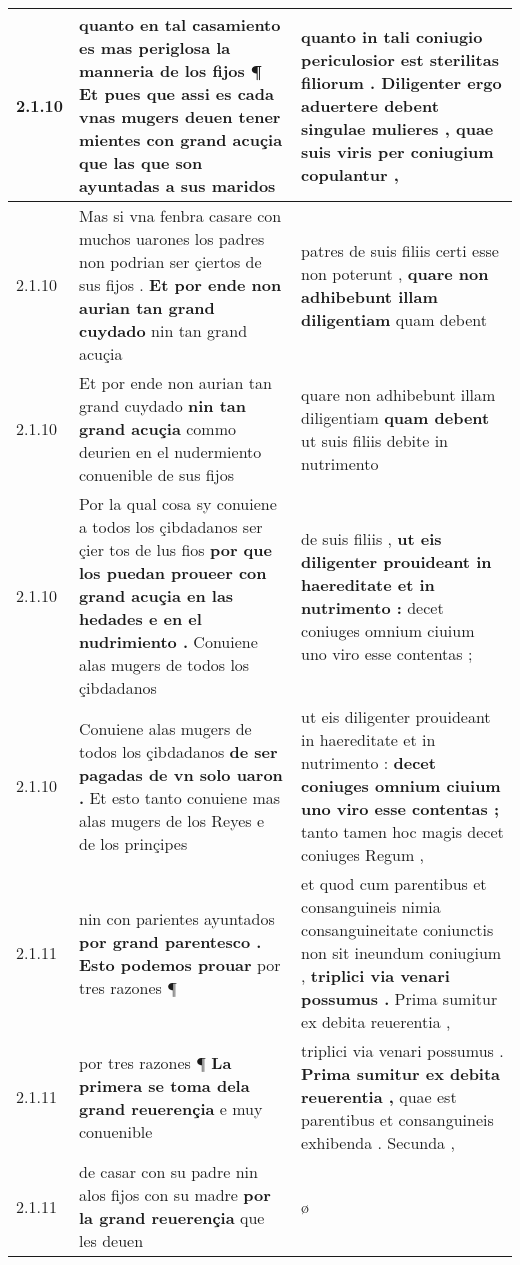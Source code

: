 \begin{tabular}{|p{1cm}|p{6.5cm}|p{6.5cm}|}
2.1.10 & quanto en tal casamiento es mas periglosa la manneria de los fijos ¶ \textbf{ Et pues que assi es cada vnas mugers deuen tener mientes con grand acuçia } que las que son ayuntadas a sus maridos & quanto in tali coniugio periculosior est sterilitas filiorum . \textbf{ Diligenter ergo aduertere debent singulae mulieres , } quae suis viris per coniugium copulantur , \\\hline
2.1.10 & Mas si vna fenbra casare con muchos uarones los padres non podrian ser çiertos de sus fijos . \textbf{ Et por ende non aurian tan grand cuydado } nin tan grand acuçia & patres de suis filiis certi esse non poterunt , \textbf{ quare non adhibebunt illam diligentiam } quam debent \\\hline
2.1.10 & Et por ende non aurian tan grand cuydado \textbf{ nin tan grand acuçia } commo deurien en el nudermiento conuenible de sus fijos & quare non adhibebunt illam diligentiam \textbf{ quam debent } ut suis filiis debite in nutrimento \\\hline
2.1.10 & Por la qual cosa sy conuiene a todos los çibdadanos ser çier tos de lus fios \textbf{ por que los puedan proueer con grand acuçia en las hedades e en el nudrimiento . } Conuiene alas mugers de todos los çibdadanos & de suis filiis , \textbf{ ut eis diligenter prouideant in haereditate et in nutrimento : } decet coniuges omnium ciuium uno viro esse contentas ; \\\hline
2.1.10 & Conuiene alas mugers de todos los çibdadanos \textbf{ de ser pagadas de vn solo uaron . } Et esto tanto conuiene mas alas mugers de los Reyes e de los prinçipes & ut eis diligenter prouideant in haereditate et in nutrimento : \textbf{ decet coniuges omnium ciuium uno viro esse contentas ; } tanto tamen hoc magis decet coniuges Regum , \\\hline
2.1.11 & nin con parientes ayuntados \textbf{ por grand parentesco . Esto podemos prouar } por tres razones ¶ & et quod cum parentibus et consanguineis nimia consanguineitate coniunctis non sit ineundum coniugium , \textbf{ triplici via venari possumus . } Prima sumitur ex debita reuerentia , \\\hline
2.1.11 & por tres razones ¶ \textbf{ La primera se toma dela grand reuerençia } e muy conuenible & triplici via venari possumus . \textbf{ Prima sumitur ex debita reuerentia , } quae est parentibus et consanguineis exhibenda . Secunda , \\\hline
2.1.11 & de casar con su padre nin alos fijos con su madre \textbf{ por la grand reuerençia } que les deuen & ø \\\hline

\end{tabular}
